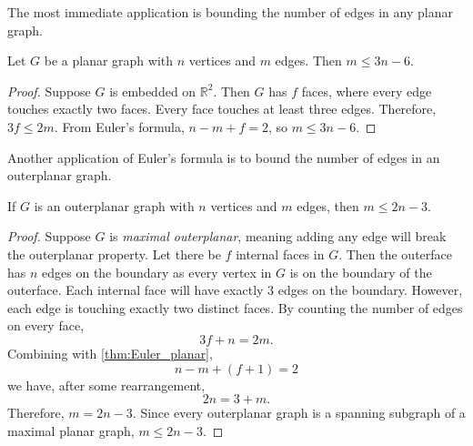 The most immediate application is bounding the number of edges in any planar graph.
\begin{theorem}\label{thm:planar_graph_edge_bound}
	Let $G$ be a planar graph with $n$ vertices and $m$ edges. Then $m \leq 3n - 6$.
\end{theorem}
\begin{proof}
	Suppose $G$ is embedded on $\mathbb{R}^2$. Then $G$ has $f$ faces, where every edge touches exactly two faces. Every face touches at least three edges. Therefore, $3f \leq 2m$. From Euler's formula, $n - m + f = 2$, so $m \leq 3n - 6$. 
\end{proof}

Another application of Euler's formula is to bound the number of edges in an outerplanar graph.
\begin{theorem}\label{thm:outerplanar_bound}
	If \(G\) is an outerplanar graph with \(n\) vertices and \(m\) edges, then \(m \leq 2n - 3\).
\end{theorem}

\begin{proof}
	Suppose \(G\) is \textit{maximal outerplanar}, meaning adding any edge will break the outerplanar property. Let there be \(f\) internal faces in $G$. Then the outerface has \(n\) edges on the boundary as every vertex in $G$ is on the boundary of the outerface. Each internal face will have exactly \(3\) edges on the boundary. However, each edge is touching exactly two distinct faces. By counting the number of edges on every face,
	\begin{equation*}
		3 f + n = 2m.
	\end{equation*}
	Combining with \cref{thm:Euler_planar},
	\begin{equation*}
		n - m + (f + 1) = 2
	\end{equation*}
	we have, after some rearrangement,
	\begin{equation*}
		2n = 3 + m.
	\end{equation*}
	Therefore, \(m = 2n - 3\). Since every outerplanar graph is a spanning subgraph of a maximal planar graph, \(m \leq 2n - 3\).
\end{proof}
